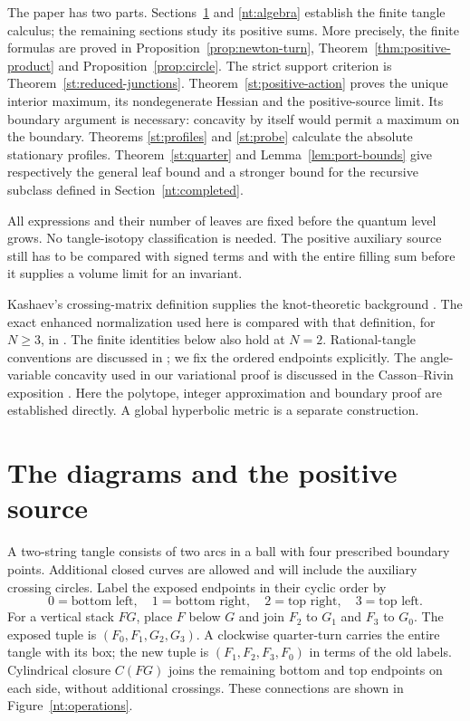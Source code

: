 \documentclass[11pt]{article}
\numberwithin{equation}{section}
\theoremstyle{definition}\newtheorem{definition}[theorem]{Definition}
\theoremstyle{remark}\newtheorem{remark}[theorem]{Remark}
\begin{document}
The paper has two parts. Sections~\ref{nt:diagrams} and
\ref{nt:algebra} establish the finite tangle calculus; the remaining
sections study its positive sums. More precisely, the finite formulas
are proved in
Proposition~\ref{prop:newton-turn}, Theorem~\ref{thm:positive-product}
and Proposition~\ref{prop:circle}. The strict support criterion is
Theorem~\ref{st:reduced-junctions}. Theorem~\ref{st:positive-action}
proves the unique interior maximum, its nondegenerate Hessian and the
positive-source limit. Its boundary argument is necessary: concavity
by itself would permit a maximum on the boundary. Theorems
\ref{st:profiles} and \ref{st:probe} calculate the absolute stationary
profiles. Theorem~\ref{st:quarter} and Lemma~\ref{lem:port-bounds}
give respectively the general leaf bound and a stronger bound for the
recursive subclass defined in Section~\ref{nt:completed}.

All expressions and their number of leaves are fixed before the
quantum level grows. No tangle-isotopy classification is needed.
The positive auxiliary source still has to be compared with signed
terms and with the entire filling sum before it supplies a volume
limit for an invariant.

Kashaev's crossing-matrix definition supplies the knot-theoretic
background \cite{Kashaev1995}. The exact enhanced normalization used
here is compared with that definition, for $N\ge3$, in
\cite[Theorem~10.1]{Finite}. The finite identities below also hold
at $N=2$. Rational-tangle conventions are discussed in
\cite{KauffmanLambropoulou}; we fix the ordered endpoints explicitly.
The angle-variable concavity used in our variational proof is discussed
in the Casson--Rivin exposition \cite{FuterGueritaud}. Here the
polytope, integer approximation and boundary proof are established
directly. A global hyperbolic metric is a separate construction.

\section{The diagrams and the positive source}\label{nt:diagrams}
A two-string tangle consists of two arcs in a ball with four prescribed
boundary points. Additional closed curves are allowed and will include
the auxiliary crossing circles. Label the exposed endpoints in their
cyclic order by
\[
0=\text{bottom left},\quad1=\text{bottom right},\quad
2=\text{top right},\quad3=\text{top left}.
\]
For a vertical stack $FG$, place $F$ below $G$ and join $F_2$ to $G_1$
and $F_3$ to $G_0$. The exposed tuple is $(F_0,F_1,G_2,G_3)$.
A clockwise quarter-turn carries the entire tangle with its box; the
new tuple is $(F_1,F_2,F_3,F_0)$ in terms of the old labels.
Cylindrical closure $C(FG)$ joins the remaining bottom and top endpoints
on each side, without additional crossings. These connections are shown
in Figure~\ref{nt:operations}.
\end{document}
